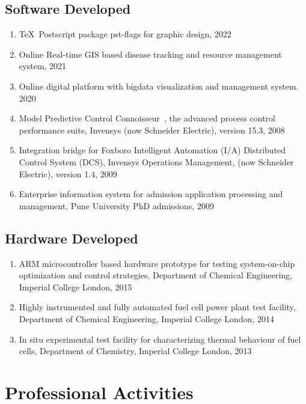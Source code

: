 \documentclass[10pt]{article}
\begin{document}
\subsection{Software Developed}
\begin{enumerate}[nosep]
\item \TeX\ Postscript package \textsf{pst-flags} for graphic design, 2022
\item Online Real-time GIS based disease tracking and resource management system, 2021
\item Online digital platform with bigdata visualization and management system. 2020
\item Model Predictive Control \textsf{Connoisseur}\texttrademark\ , the advanced process control performance suite, Invensys (now Schneider Electric), version 15.3, 2008
\item Integration bridge for Foxboro Intelligent Automation (I/A) Distributed Control System (DCS), Invensys Operations Management, (now Schneider Electric), version 1.4, 2009
\item Enterprise information system for admission application processing and management, Pune University PhD admissions, 2009
\end{enumerate}

\subsection{Hardware Developed}
\begin{enumerate}[nosep]
\item ARM microcontroller based hardware prototype for testing system-on-chip optimization and control strategies, Department of Chemical Engineering, Imperial College London, 2015

\item Highly instrumented and fully automated fuel cell power plant test facility, Department of Chemical Engineering, Imperial College London, 2014

\item In situ experimental test facility for characterizing thermal behaviour of fuel cells, Department of Chemistry, Imperial College London, 2013
\end{enumerate}

\section{Professional Activities}
\end{document}
